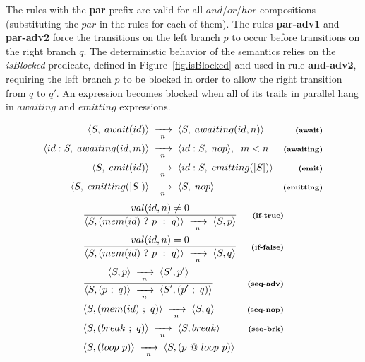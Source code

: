 \documentclass{acm_proc_article-sp}
\newcommand{\ST}{\1\xrightarrow[~n~]{}\1}
\newcommand{\LL}{\langle}
\newcommand{\RR}{\rangle}
\newcommand{\DS}{\displaystyle}
\newcommand{\rr}[1] {{\textbf{\scriptsize{#1}}}}
\newcommand{\1}{\;}
\newcommand{\2}{\;\;}
\newcommand{\3}{\;\;\;}
\newcommand{\5}{\;\;\;\;\;}
\begin{document}
The rules with the \rr{par} prefix are valid for all $and$/$or$/$hor$ 
compositions (substituting the $par$ in the rules for each of them).
%
The rules \rr{par-adv1} and \rr{par-adv2} force the transitions on the left 
branch $p$ to occur before transitions on the right branch $q$.
%
The deterministic behavior of the semantics relies on the \emph{isBlocked} 
predicate, defined in Figure~\ref{fig.isBlocked} and used in rule 
\rr{and-adv2}, requiring the left branch $p$ to be blocked in order to allow 
the right transition from $q$ to $q'$.
%
An expression becomes blocked when all of its trails in parallel hang in 
$awaiting$ and $emitting$ expressions.

\begin{figure}
%
{ \setlength{\jot}{7pt}
\begin{align*}
\LL S,\1await(id) \RR &\ST
\LL S,\1awaiting(id,n) \RR
    & \rr{(await)}      \\
\LL id:S,\1awaiting(id,m) \RR &\ST
\LL id:S,\1nop \RR, \2m<n
    & \rr{(awaiting)}   \\
\LL S,\1emit(id) \RR &\ST
\LL id:S,\1emitting(|S|) \RR
    & \rr{(emit)}       \\
\LL S,\1emitting(|S|) \RR &\ST
\LL S,\1nop \RR
    & \rr{(emitting)}
\end{align*}
}
%
{ %
\begin{eqnarray*}
& \frac
    { \DS val(id,n) \neq 0 }
    { \DS \LL S, (mem(id)~?~p~:~q) \RR \ST
          \LL S, p \RR }
    & \rr{(if-true)}       \\
& \frac
    { \DS val(id,n) = 0 }
    { \DS \LL S, (mem(id)~?~p~:~q) \RR \ST
          \LL S, q \RR }
    & \rr{(if-false)}       \\
& \frac
    {\DS \LL S,p \RR \ST \LL S',p' \RR }
    {\DS \LL S, (p~;~q) \RR \ST \LL S', (p'~;~q) \RR }
    & \rr{(seq-adv)}        \\
& \LL S, (mem(id)~;~q) \RR \ST  \LL S, q \RR
    & \rr{(seq-nop)}        \\
& \LL S, (break~;~q) \RR \ST \LL S, break \RR
    & \rr{(seq-brk)}        \\
%
& \LL S, (loop~p) \RR \ST \LL S, (p~@~loop~p) \RR

\end{eqnarray*}}
\end{figure}
\end{document}
